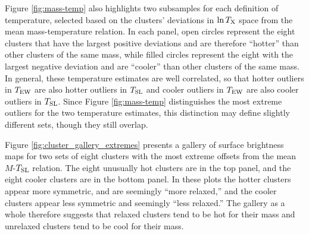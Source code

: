 \documentclass{aastex} \usepackage{natbib}
\begin{document}

Figure \ref{fig:mass-temp} also highlights two subsamples for each
definition of temperature, selected based on the clusters' deviations
in $\ln T_{\rm X}$ space from the mean mass-temperature relation.  In each
panel, open circles represent the eight clusters that have the largest
positive deviations and are therefore ``hotter'' than other clusters
of the same mass, while filled circles represent the eight with the
largest negative deviation and are ``cooler'' than other clusters of
the same mass.  In general, these temperature estimates are well
correlated, so that hotter outliers in $T_{\rm EW}$ are also hotter outliers
in $T_{\rm SL}$ and cooler outliers in $T_{\rm EW}$ are also cooler outliers in
$T_{\rm SL}$.  Since Figure \ref{fig:mass-temp} distinguishes the most
extreme outliers for the two temperature estimates, this distinction
may define slightly different sets, though they still overlap.

Figure \ref{fig:cluster_gallery_extremes} presents a gallery of
surface brightness maps for two sets of eight clusters with the most
extreme offsets from the mean $M$-$T_{\rm SL}$ relation.  The eight
unusually hot clusters are in the top panel, and the eight cooler
clusters are in the bottom panel.  In these plots the hotter clusters
appear more symmetric, and are seemingly ``more relaxed,'' and the
cooler clusters appear less symmetric and seemingly ``less relaxed.''
The gallery as a whole therefore suggests that relaxed clusters tend
to be hot for their mass and unrelaxed clusters tend to be cool for
their mass.
\end{document}
